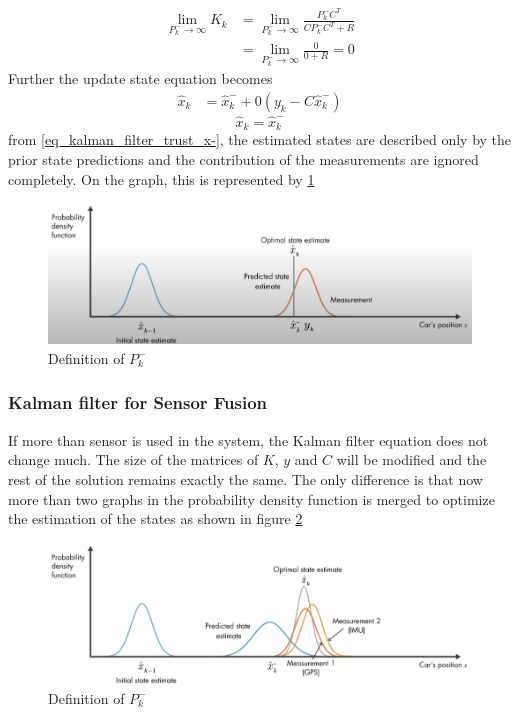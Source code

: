 \begin{align*}
\lim_{P^{-}_{k}\to \infty}K_{k} &= \lim_{P^{-}_{k}\to \infty}\frac{P^{-}_{k} C^{T}}{C P^{-}_{k} C^{T} + R} \\
&= \lim_{P^{-}_{k}\to \infty}\frac{0}{0 + R} = 0
\end{align*}
Further the update state equation becomes
\begin{align*}
	\hat{x}_{k} &= \hat{x}^{-}_{k} + 0(y_{k} - C\hat{x}^{-}_{k})
\end{align*}
\begin{equation}\label{eq_kalman_filter_trust_x-}
	\hat{x}_{k} = \hat{x}^{-}_{k}
\end{equation}
from \eqref{eq_kalman_filter_trust_x-}, the estimated states are described only by the prior state predictions and the contribution of the measurements are ignored completely. On the graph, this is represented by \ref{fig_kalman_filter_rust_x-}
\begin{figure}[h!]
	\centering
	\includegraphics[width=\linewidth]{Bilder/kalman_filter_trust_x.png}
	\caption{Definition of $P^{-}_{k}$}
	\label{fig_kalman_filter_rust_x-}
\end{figure}

\subsubsection{Kalman filter for Sensor Fusion}
If more than sensor is used in the system, the Kalman filter equation does not change much. The size of the matrices of $K$, $y$ and $C$ will be modified and the rest of the solution remains exactly the same. The only difference is that now more than two graphs in the probability density function is merged to optimize the estimation of the states as shown in figure \ref{fig_kalman_filter_sensor_fusion}
\begin{figure}[h!]
	\centering
	\includegraphics[width=\linewidth]{Bilder/kalman_filter_sensor_fusion.png}
	\caption{Definition of $P^{-}_{k}$}
	\label{fig_kalman_filter_sensor_fusion}
\end{figure}
\newpage

